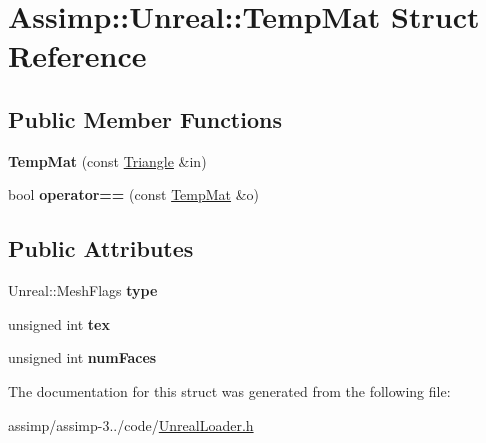 \hypertarget{struct_assimp_1_1_unreal_1_1_temp_mat}{\section{Assimp\+:\+:Unreal\+:\+:Temp\+Mat Struct Reference}
\label{struct_assimp_1_1_unreal_1_1_temp_mat}
}
\subsection*{Public Member Functions}
\begin{DoxyCompactItemize}
\item 
\hypertarget{struct_assimp_1_1_unreal_1_1_temp_mat_af0afb28d697b9a1ccbea77b7d48f0e9e}{{\bfseries Temp\+Mat} (const \hyperlink{struct_assimp_1_1_unreal_1_1_triangle}{Triangle} \&in)}\label{struct_assimp_1_1_unreal_1_1_temp_mat_af0afb28d697b9a1ccbea77b7d48f0e9e}

\item 
\hypertarget{struct_assimp_1_1_unreal_1_1_temp_mat_afe56fde5120c213a6cd6d25a3dd2e02c}{bool {\bfseries operator==} (const \hyperlink{struct_assimp_1_1_unreal_1_1_temp_mat}{Temp\+Mat} \&o)}\label{struct_assimp_1_1_unreal_1_1_temp_mat_afe56fde5120c213a6cd6d25a3dd2e02c}

\end{DoxyCompactItemize}
\subsection*{Public Attributes}
\begin{DoxyCompactItemize}
\item 
\hypertarget{struct_assimp_1_1_unreal_1_1_temp_mat_aabf18fba32c6c596c468e33e42c43332}{Unreal\+::\+Mesh\+Flags {\bfseries type}}\label{struct_assimp_1_1_unreal_1_1_temp_mat_aabf18fba32c6c596c468e33e42c43332}

\item 
\hypertarget{struct_assimp_1_1_unreal_1_1_temp_mat_a5facc6104f4c1af9a521a08a394b0db3}{unsigned int {\bfseries tex}}\label{struct_assimp_1_1_unreal_1_1_temp_mat_a5facc6104f4c1af9a521a08a394b0db3}

\item 
\hypertarget{struct_assimp_1_1_unreal_1_1_temp_mat_a0493081a56c286f8d6c9c4e6bdc28738}{unsigned int {\bfseries num\+Faces}}\label{struct_assimp_1_1_unreal_1_1_temp_mat_a0493081a56c286f8d6c9c4e6bdc28738}

\end{DoxyCompactItemize}


The documentation for this struct was generated from the following file\+:\begin{DoxyCompactItemize}
\item 
assimp/assimp-\/3../code/\hyperlink{_unreal_loader_8h}{Unreal\+Loader.\+h}\end{DoxyCompactItemize}
